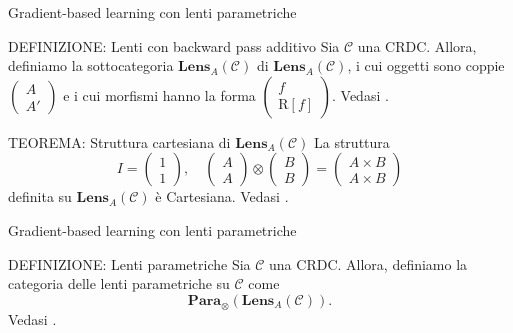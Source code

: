 \documentclass{beamer}
\begin{document}
\begin{frame}{Gradient-based learning con lenti parametriche}
    \begin{block}{DEFINIZIONE: Lenti con backward pass additivo}
        Sia $\mathcal{C}$ una CRDC. Allora, definiamo la sottocategoria $\mathbf{Lens}_A(\mathcal{C})$ di $\mathbf{Lens}_A(\mathcal{C})$, i cui oggetti sono coppie $\left(\begin{smallmatrix} A \\ A' \end{smallmatrix}\right)$ e i cui morfismi hanno la forma $\left(\begin{smallmatrix} f \\ \mathrm{R}[f] \end{smallmatrix}\right)$.
        Vedasi \cite{cruttwell2022categorical}.
    \end{block}

    \begin{block}{TEOREMA: Struttura cartesiana di $\mathbf{Lens}_A(\mathcal{C})$}
        La struttura
        \[I = \left(\begin{smallmatrix} 1 \\ 1 \end{smallmatrix}\right), \quad \left(\begin{smallmatrix} A \\ A \end{smallmatrix}\right) \otimes \left(\begin{smallmatrix} B \\ B \end{smallmatrix}\right) = \left(\begin{smallmatrix} A \times B \\ A \times B \end{smallmatrix}\right)\]
        definita su $\mathbf{Lens}_A(\mathcal{C})$ è Cartesiana. Vedasi \cite{cruttwell2022categorical}.
    \end{block}
\end{frame}

\begin{frame}{Gradient-based learning con lenti parametriche}
    \begin{block}{DEFINIZIONE: Lenti parametriche}
        Sia $\mathcal{C}$ una CRDC. Allora, definiamo la categoria delle lenti parametriche su $\mathcal{C}$ come \[\mathbf{Para}_{\otimes}(\mathbf{Lens}_A(\mathcal{C})).\]
        Vedasi \cite{gavranovic2024fundamental}.
    \end{block}
\end{frame}
\end{document}
